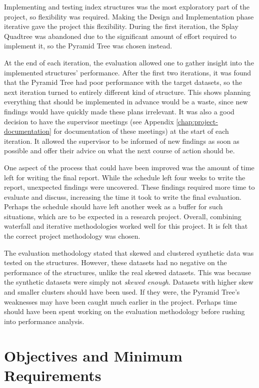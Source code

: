 Implementing and testing index structures was the most exploratory part of the project, so flexibility was required. Making the Design and Implementation phase iterative gave the project this flexibility. During the first iteration, the Splay Quadtree was abandoned due to the significant amount of effort required to implement it, so the Pyramid Tree was chosen instead.

At the end of each iteration, the evaluation allowed one to gather insight into the implemented structures' performance.  After the first two iterations, it was found that the Pyramid Tree had poor performance with the target datasets, so the next iteration turned to entirely different kind of structure. This shows planning everything that should be implemented in advance would be a waste, since new findings would have quickly made these plans irrelevant. It  was also a good decision to have the supervisor meetings (see Appendix \ref{chap:project-documentation} for documentation of these meetings) at the start of each iteration. It allowed the supervisor to be informed of new findings as soon as possible and offer their advice on what the next course of action should be.

One aspect of the process that could have been improved was the amount of time left for writing the final report. While the schedule left four weeks to write the report, unexpected findings were uncovered. These findings required more time to evaluate and discuss, increasing the time it took to write the final evaluation. Perhaps the schedule should have left another week as a buffer for such situations, which are to be expected in a research project. Overall, combining waterfall and iterative methodologies worked well for this project. It is felt that the correct project methodology was chosen.

The evaluation methodology stated that skewed and clustered synthetic data was tested on the structures. However, these datasets had no negative on the performance of the structures, unlike the real skewed datasets. This was because the synthetic datasets were simply not \textit{skewed enough}. Datasets with higher skew and smaller clusters should have been used. If they were, the Pyramid Tree's weaknesses may have been caught much earlier in the project. Perhaps time should have been spent working on the evaluation methodology before rushing into performance analysis.

\section{Objectives and Minimum Requirements}

